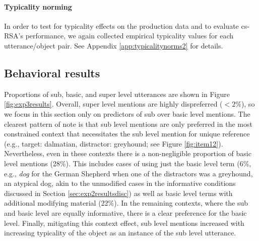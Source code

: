 \documentclass[11pt]{article}
\newcommand{\figref}[1]{Figure \ref{#1}}
\newcommand{\appref}[1]{Appendix \ref{#1}}
\newcommand{\sectionref}[1]{Section \ref{#1}}
\begin{document}
\paragraph{Typicality norming}
\label{sec:typicalitynormingnominal}

In order to test for typicality effects on the production data and to evaluate cs-RSA's performance, we again collected empirical typicality values for each utterance/object pair. See \appref{app:typicalitynorms2} for details.

\subsection{Behavioral results}


Proportions of sub, basic, and super level utterances are shown in \figref{fig:exp3results}. Overall, super level mentions are highly dispreferred ($< 2\%$), so we focus in this section only on predictors of sub over basic level mentions. The clearest pattern of note is that sub level mentions are only preferred in the most constrained context that necessitates the sub level mention for unique reference (e.g., target: dalmatian, distractor: greyhound; see \figref{fig:item12}). Nevertheless, even in these contexts there is a non-negligible proportion of basic level mentions (28\%). This includes cases of using just the basic level term (6\%, e.g., \emph{dog} for the German Shepherd when one of the distractors was a greyhound, an atypical dog, akin to the unmodified cases in the informative conditions discussed in \sectionref{sec:exp2resultsdisc}) as well as basic level terms with additional modifying material (22\%). In the remaining contexts, where the sub and basic level are equally informative, there is a clear preference for the basic level. Finally, mitigating this context effect, sub level mentions increased with increasing typicality of the object as an instance of the sub level utterance.
\end{document}
